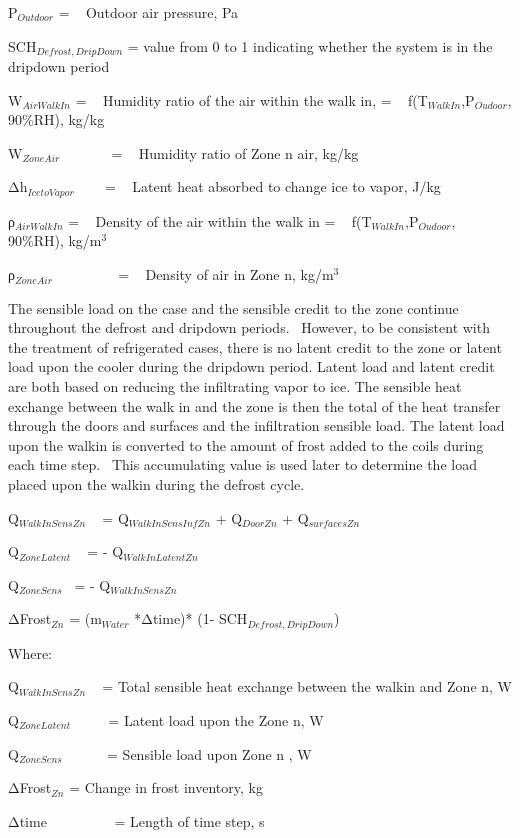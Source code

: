 P\(_{Outdoor}\) = ~ Outdoor air pressure, Pa

SCH\(_{Defrost,DripDown}\) = value from 0 to 1 indicating whether the system is in the dripdown period

W\(_{AirWalkIn}\) = ~ Humidity ratio of the air within the walk in, = ~ f(T\(_{WalkIn}\),P\(_{Oudoor}\), 90\%RH), kg/kg

W\(_{ZoneAir}\) ~~~~~~ = ~ Humidity ratio of Zone n air, kg/kg

Δh\(_{IcetoVapor}\) ~~~ = ~ Latent heat absorbed to change ice to vapor, J/kg

ρ\(_{AirWalkIn}\) = ~ Density of the air within the walk in = ~ f(T\(_{WalkIn}\),P\(_{Oudoor}\), 90\%RH), kg/m\(^{3}\)

ρ\(_{ZoneAir}\) ~~~~~~~~ = ~ Density of air in Zone n, kg/m\(^{3}\)

The sensible load on the case and the sensible credit to the zone continue throughout the defrost and dripdown periods.~ However, to be consistent with the treatment of refrigerated cases, there is no latent credit to the zone or latent load upon the cooler during the dripdown period. Latent load and latent credit are both based on reducing the infiltrating vapor to ice. The sensible heat exchange between the walk in and the zone is then the total of the heat transfer through the doors and surfaces and the infiltration sensible load. The latent load upon the walkin is converted to the amount of frost added to the coils during each time step.~ This accumulating value is used later to determine the load placed upon the walkin during the defrost cycle.

Q\(_{WalkInSensZn}\) ~ = Q\(_{WalkInSensInfZn}\) + Q\(_{DoorZn}\) + Q\(_{surfacesZn}\)

Q\(_{ZoneLatent}\) ~ = - Q\(_{WalkInLatentZn}\)

Q\(_{ZoneSens}\)~ = - Q\(_{WalkInSensZn}\)

ΔFrost\(_{Zn}\) = (m\(_{Water}\) *Δtime)* (1- SCH\(_{Defrost,DripDown}\))

Where:

Q\(_{WalkInSensZn}\) ~ = Total sensible heat exchange between the walkin and Zone n, W

Q\(_{ZoneLatent}\) ~~~~ = Latent load upon the Zone n, W

Q\(_{ZoneSens}\) ~~~~~ = Sensible load upon Zone n , W

ΔFrost\(_{Zn}\) = Change in frost inventory, kg

Δtime~~~~~~~~~ = Length of time step, s


